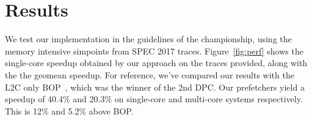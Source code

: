 
\section{Results}
\label{Results}
We test our implementation in the guidelines of the championship, using the
memory intensive simpoints from SPEC 2017 traces. Figure~\ref{fig:perf} shows 
the single-core speedup obtained by our approach on the traces provided, 
along with the the geomean speedup. 
For reference, we've compared our results with the L2C only BOP~\cite{BOP}, 
which was the winner of the 2nd DPC. Our prefetchers yield a speedup of 40.4\% 
and 20.3\% on single-core and multi-core systems respectively. This is 12\% and 
5.2\% above BOP.
